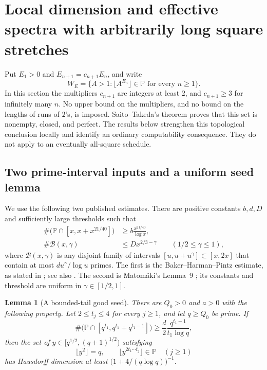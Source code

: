 \documentclass[11pt,a4paper]{article}
\newtheorem{lemma}[theorem]{Lemma}
\theoremstyle{definition}
\theoremstyle{remark}
\numberwithin{equation}{section}
\begin{document}
\section{Local dimension and effective spectra with arbitrarily long square stretches}
\label{tw:newloc:section}

Put $E_1>0$ and $E_{n+1}=c_{n+1}E_n$, and write
\[
 W_E=\{A>1:\lfloor A^{E_n}\rfloor\in\mathbb P\text{ for every }n\ge1\}.
\]
In this section the multipliers $c_{n+1}$ are integers at least $2$, and
$c_{n+1}\ge3$ for infinitely many $n$. No upper bound on the multipliers,
and no bound on the lengths of runs of $2$'s, is imposed.
Saito--Takeda's theorem \cite{SaitoTakeda2022} proves that this set
is nonempty, closed, and perfect. The results below strengthen this topological conclusion locally
and identify an ordinary computability consequence. They do not apply to
an eventually all-square schedule.

\subsection{Two prime-interval inputs and a uniform seed lemma}

We use the following two published estimates. There are positive constants
$b,d,D$ and sufficiently large thresholds such that
\begin{align}
 \#\bigl(\mathbb P\cap[x,x+x^{21/40}]\bigr)
   &\ge b\frac{x^{21/40}}{\log x},\label{tw:newloc:bhp}\\
 \#\mathcal B(x,\gamma)&\le D x^{2/3-\gamma}
       \qquad(1/2\le\gamma\le1),\label{tw:newloc:exceptional}
\end{align}
where $\mathcal B(x,\gamma)$ is any disjoint family of intervals
$[u,u+u^\gamma]\subset[x,2x]$ that contain at most
$d u^\gamma/\log u$ primes. The first is the Baker--Harman--Pintz estimate,
as stated in \cite[Lemma~3.1]{SaitoDimension2021}; see also \cite{BHP}.
The second is Matom\"aki's Lemma~9 \cite{Matomaki2010}; its constants and threshold are uniform in
$\gamma\in[1/2,1]$.

\begin{lemma}[A bounded-tail good seed]\label{tw:newloc:goodseed}
There are $Q_0>0$ and $a>0$ with the following property. Let
$2\le t_j\le4$ for every $j\ge1$, and let $q\ge Q_0$ be prime. If
\[
 \#\bigl(\mathbb P\cap[q^{t_1},q^{t_1}+q^{t_1-1}]\bigr)
 \ge \frac{d}{2}\frac{q^{t_1-1}}{t_1\log q},
\]
then the set of $y\in[q^{1/2},(q+1)^{1/2})$ satisfying
\[
 \lfloor y^{2}\rfloor=q,\qquad
 \lfloor y^{2t_1\cdots t_j}\rfloor\in\mathbb P\quad(j\ge1)
\]
has Hausdorff dimension at least
$\bigl(1+4/(q\log q)\bigr)^{-1}$.
\end{lemma}
\end{document}
